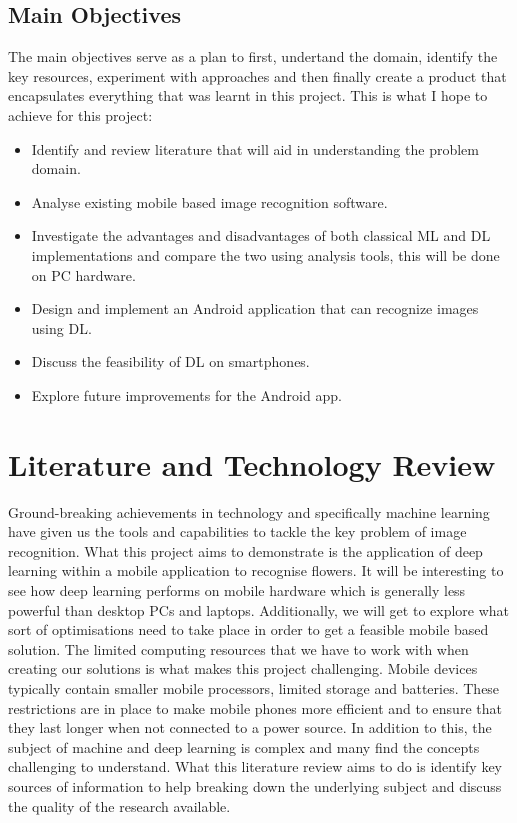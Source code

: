 \documentclass[12pt,a4paper]{report}
\begin{document}
\section{Main Objectives}
The main objectives serve as a plan to first, undertand the domain, 
identify the key resources, experiment with approaches and then finally create a product that encapsulates 
everything that was learnt in this project. This is what I hope to achieve for this project:
\begin{itemize}
    \item Identify and review literature that will aid in understanding the problem domain.
    \item Analyse existing mobile based image recognition software.
    \item Investigate the advantages and disadvantages of both classical ML and DL implementations and compare the two 
using analysis tools, this will be done on PC hardware.
    \item Design and implement an Android application that can recognize images using DL.
    \item Discuss the feasibility of DL on smartphones.
    \item Explore future improvements for the Android app.
\end{itemize}

\clearpage
\chapter{Literature and Technology Review}

Ground-breaking achievements in technology and specifically machine learning have given us the tools and capabilities to
tackle the key problem of image recognition. What this project aims to demonstrate is the application of deep learning 
within a mobile application to recognise flowers. It will be interesting to see how deep learning performs on mobile 
hardware which is generally less powerful than desktop PCs and laptops. Additionally, we will get to explore what sort 
of optimisations need to take place in order to get a feasible mobile based solution.  The limited computing resources 
that we have to work with when creating our solutions is what makes this project challenging. Mobile devices typically 
contain smaller mobile processors, limited storage and batteries. These restrictions are in place to 
make mobile phones more efficient and to ensure that they last longer when not connected to a power source. In addition
to this, the subject of machine and deep learning is complex and many find the concepts challenging to understand. 
What this literature review aims to do is identify key sources of information to help breaking down the underlying 
subject and discuss the quality of the research available.
\end{document}
